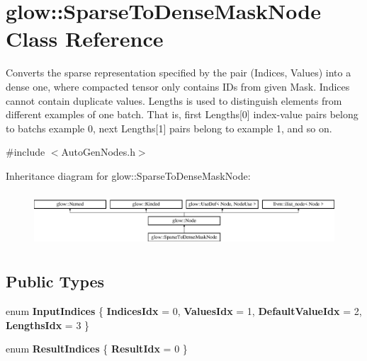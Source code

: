 \hypertarget{classglow_1_1_sparse_to_dense_mask_node}{}\section{glow\+:\+:Sparse\+To\+Dense\+Mask\+Node Class Reference}
\label{classglow_1_1_sparse_to_dense_mask_node}


Converts the sparse representation specified by the pair (Indices, Values) into a dense one, where compacted tensor only contains I\+Ds from given Mask. Indices cannot contain duplicate values. Lengths is used to distinguish elements from different examples of one batch. That is, first Lengths\mbox{[}0\mbox{]} index-\/value pairs belong to batch\textquotesingle{}s example 0, next Lengths\mbox{[}1\mbox{]} pairs belong to example 1, and so on.  




{\ttfamily \#include $<$Auto\+Gen\+Nodes.\+h$>$}

Inheritance diagram for glow\+:\+:Sparse\+To\+Dense\+Mask\+Node\+:\begin{figure}[H]
\begin{center}
\leavevmode
\includegraphics[height=2.028986cm]{classglow_1_1_sparse_to_dense_mask_node}
\end{center}
\end{figure}
\subsection*{Public Types}
\begin{DoxyCompactItemize}
\item 
\mbox{\label{classglow_1_1_sparse_to_dense_mask_node_a340c84c80969666f2d4d00cbf131ff60}} 
enum {\bfseries Input\+Indices} \{ {\bfseries Indices\+Idx} = 0, 
{\bfseries Values\+Idx} = 1, 
{\bfseries Default\+Value\+Idx} = 2, 
{\bfseries Lengths\+Idx} = 3
 \}
\item 
\mbox{\label{classglow_1_1_sparse_to_dense_mask_node_a67f24afc51afd4109eb5d71549555c34}} 
enum {\bfseries Result\+Indices} \{ {\bfseries Result\+Idx} = 0
 \}
\end{DoxyCompactItemize}
